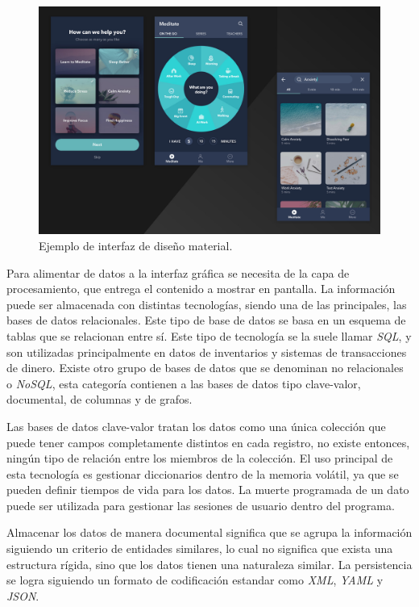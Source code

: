 \begin{figure}[h]
	\centering
	\includegraphics[width=\textwidth]{./Figures/ch1MaterialDesign.jpg}
	\caption{Ejemplo de interfaz de diseño material. \citep{WEBSITE:Material}}
	\label{fig:ch1MaterialDesign}
\end{figure}

Para alimentar de datos a la interfaz gráfica se necesita de la capa de procesamiento, que entrega el contenido a mostrar en pantalla. La información puede ser almacenada con distintas tecnologías, siendo una de las principales, las bases de datos relacionales.
Este tipo de base de datos se basa en un esquema de tablas que se relacionan entre sí. Este tipo de tecnología se la suele llamar \emph{SQL}, y son utilizadas principalmente en datos de inventarios y sistemas de transacciones de dinero.
Existe otro grupo de bases de datos que se denominan no relacionales o \emph{NoSQL}, esta categoría contienen a las bases de datos tipo clave-valor, documental, de columnas y de grafos.

Las bases de datos clave-valor tratan los datos como una única colección que puede tener campos completamente distintos en cada registro, no existe entonces, ningún tipo de relación entre los miembros de la colección. El uso principal de esta tecnología es gestionar diccionarios dentro de la memoria volátil, ya que se pueden definir tiempos de vida para los datos. La muerte programada de un dato puede ser utilizada para gestionar las sesiones de usuario dentro del programa.

Almacenar los datos de manera documental significa que se agrupa la información siguiendo un criterio de entidades similares, lo cual no significa que exista una estructura rígida, sino que los datos tienen una naturaleza similar.
La persistencia se logra siguiendo un formato de codificación estandar como \emph{XML}, \emph{YAML} y \emph{JSON}.

